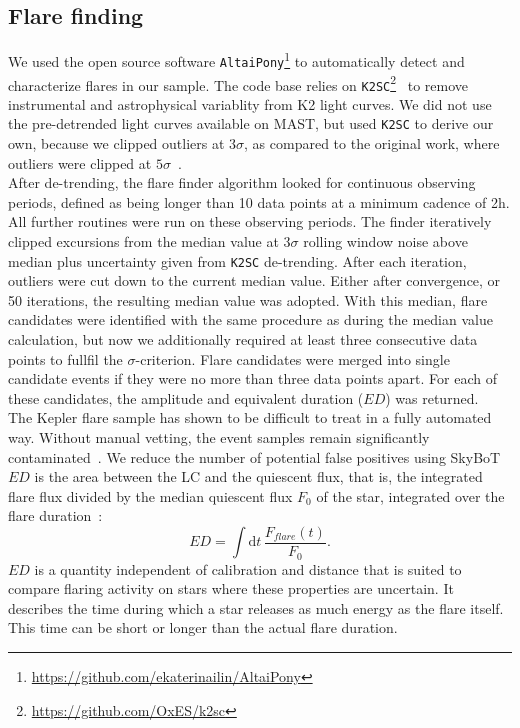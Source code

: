 \documentclass{aa}
\begin{document}
\subsection{Flare finding}
We used the open source software \texttt{AltaiPony}\footnote{\url{https://github.com/ekaterinailin/AltaiPony}} to automatically detect and characterize flares in our sample. The code base relies on \texttt{K2SC}\footnote{\url{https://github.com/OxES/k2sc}}~\citep{aigrain_k2sc_2016} to remove instrumental and astrophysical variablity from K2 light curves. We did not use the pre-detrended light curves available on MAST, but used \texttt{K2SC} to derive our own, because we clipped outliers at $3\sigma$, as compared to the original work, where outliers were clipped at $5\sigma$~\citep{aigrain_k2sc_2016}.
\\
After de-trending, the flare finder algorithm looked for continuous observing periods, defined as being longer than 10 data points at a minimum cadence of 2\;h. All further routines were run on these observing periods. The finder iteratively clipped excursions from the median value at $3\sigma$ rolling window noise above median plus uncertainty given from \texttt{K2SC} de-trending. After each iteration, outliers were cut down to the current median value. Either after convergence, or 50 iterations, the resulting median value was adopted. With this median, flare candidates were identified with the same procedure as during the median value calculation, but now we additionally required at least three consecutive data points to fullfil the $\sigma$-criterion. Flare candidates were merged into single candidate events if they were no more than three data points apart. For each of these candidates, the amplitude and equivalent duration ($ED$) was returned.
\\
The Kepler flare sample has shown to be difficult to treat in a fully automated way. Without manual vetting, the event samples remain significantly contaminated~\citep{yang_keplerflares_2019}. We reduce the number of potential false positives using SkyBoT
\\
$ED$ is the area between the LC and the quiescent flux, that is, the integrated flare flux divided by the median quiescent flux $F_0$ of the star, integrated over the flare duration~\citep{hunt-walker_most_2012}:
\begin{equation}
\label{05_ED}
ED=\displaystyle \int \mathrm dt\, \frac{F_{flare}(t)}{F_0}.
\end{equation}
$ED$ is a quantity independent of calibration and distance that is suited to compare flaring activity on stars where these properties are uncertain. It describes the time during which a star releases as much energy as the flare itself. This time can be short or longer than the actual flare duration.
\end{document}
